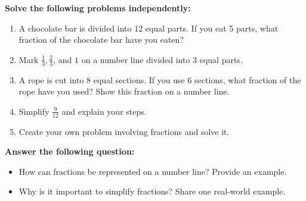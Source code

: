 \documentclass[12pt]{article}
\begin{document}
\begin{tcolorbox}[colframe=black!60, colback=white, 
coltitle=black, colbacktitle=black!15, fonttitle=\bfseries\Large, 
title=Independent Practice, halign title=center, left=10pt, right=10pt, top=10pt, bottom=100pt]
\textbf{Solve the following problems independently:}
\begin{enumerate}[itemsep=5em] %
    \item A chocolate bar is divided into 12 equal parts. If you eat 5 parts, what fraction of the chocolate bar have you eaten?
    \item Mark \( \frac{1}{3}, \frac{2}{3} \), and \( 1 \) on a number line divided into 3 equal parts.
    \item A rope is cut into 8 equal sections. If you use 6 sections, what fraction of the rope have you used? Show this fraction on a number line.
    \item Simplify \( \frac{9}{12} \) and explain your steps.
    \item Create your own problem involving fractions and solve it.
\end{enumerate}
\end{tcolorbox}

\vspace{3 cm}
\begin{tcolorbox}[colframe=black!60, colback=white, 
coltitle=black, colbacktitle=black!15, fonttitle=\bfseries\Large, 
title=Exit Ticket, halign title=center, left=10pt, right=10pt, top=10pt, bottom=15pt]
\textbf{Answer the following question:}
\begin{itemize}
    \item How can fractions be represented on a number line? Provide an example.
    \item Why is it important to simplify fractions? Share one real-world example.
\end{itemize}
\vspace{5cm}
\end{tcolorbox}
\end{document}
